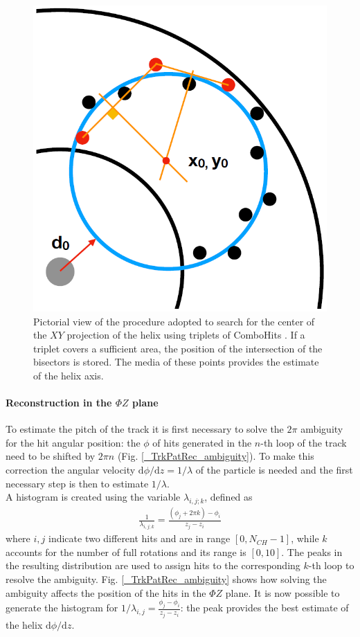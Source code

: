 \documentclass[12pt,a4paper,openright, oneside, titlepage]{book} %
\begin{document}
\begin{figure}[h!]
\centering
\includegraphics[scale=0.4]{giani_TrkPatRec_triplets}
\caption{Pictorial view of the procedure adopted to search for the center of the $XY$ projection 
of the helix using triplets of ComboHits \cite{GianiPatRec:2020}. 
If a triplet covers a sufficient area, the position of the intersection of the bisectors is stored. 
The media of these points provides the estimate of the helix axis.}
\label{_TrkPatRec_triplets}
\end{figure}


\paragraph{Reconstruction in the $\Phi Z$ plane} 
To estimate the pitch of the track it is first necessary to solve the $2\pi$ ambiguity for the hit angular position: 
the $\phi$ of hits generated in the $n$-th loop of the track need to be shifted by $2\pi n$
(Fig. \ref{_TrkPatRec_ambiguity}). 
To make this correction the angular velocity $\mathrm{d}\phi/\mathrm{d}z = 1/ \lambda$ of the particle is needed 
and the first necessary  step is then to estimate $1/\lambda$. \\
A histogram is created using the variable $\lambda_{i,j;k}$, defined as
\begin{align}
\frac{1}{\lambda_{i,j;k}} = \frac{(\phi_j+2\pi k)-\phi_i}{z_j-z_i}
\end{align}
where $i,j$ indicate two different hits and are in range $[0,N_{CH}-1]$, 
while $k$ accounts for the number of full rotations and its range is $[0,10]$.
The peaks in the resulting distribution are used to assign hits to the corresponding $k$-th loop to resolve the ambiguity. 
Fig. \ref{_TrkPatRec_ambiguity} shows how solving the ambiguity affects the position of the hits in the $\Phi Z$ plane.
It is now possible to generate the histogram for $1/\lambda_{i,j} = \frac{\phi_j-\phi_i}{z_j-z_i}$: 
the peak provides the best estimate of the helix $\mathrm{d}\phi/\mathrm{d}z$.
\end{document}
